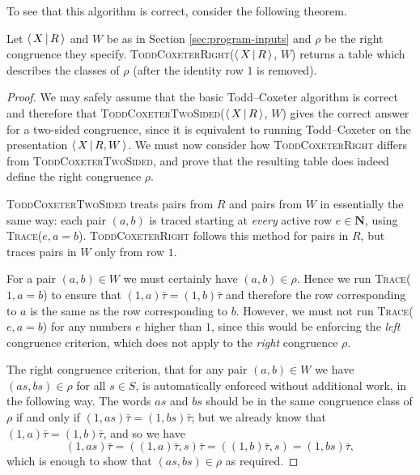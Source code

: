 To see that this algorithm is correct, consider the following theorem.

\begin{theorem}
  Let $\left\langle\,X\,\middle|\,R\,\right\rangle$ and $W$ be as in Section \ref{sec:program-inputs} and $\rho$
  be the right congruence they specify.
  \textsc{ToddCoxeterRight}($\left\langle\,X\,\middle|\,R\,\right\rangle$, $W$) returns a table which describes the
  classes of $\rho$ (after the identity row $1$ is removed).
  \begin{proof}
    We may safely assume that the basic Todd--Coxeter algorithm is correct
    \cite{todd_coxeter_1936, beetham_campbell_1976} and therefore that
    \textsc{ToddCoxeterTwoSided($\left\langle\,X\,\middle|\,R\,\right\rangle$, $W$)} gives the correct answer for a
    two-sided congruence, since it is equivalent to running Todd--Coxeter on the
    presentation $\left\langle\,X\,\middle|\,R,W\,\right\rangle$.  We must now consider how
    \textsc{ToddCoxeterRight} differs from \textsc{ToddCoxeterTwoSided}, and
    prove that the resulting table does indeed define the right congruence
    $\rho$.

    \textsc{ToddCoxeterTwoSided} treats pairs from $R$ and pairs from $W$ in
    essentially the same way: each pair $(a,b)$ is traced starting at
    \textit{every} active row $e \in \mathbf{N}$, using
    \textsc{Trace}($e, a=b$).  \textsc{ToddCoxeterRight} follows this method for
    pairs in $R$, but traces pairs in $W$ only from row $1$.

    For a pair $(a,b) \in W$ we must certainly have $(a,b) \in \rho$.  Hence we
    run \textsc{Trace($1, a=b$)} to ensure that $(1,a)\bar\tau = (1,b)\bar\tau$
    and therefore the row corresponding to $a$ is the same as the row
    corresponding to $b$.  However, we must not run \textsc{Trace($e, a=b$)} for
    any numbers $e$ higher than $1$, since this would be enforcing the
    \textit{left} congruence criterion, which does not apply to the
    \textit{right} congruence $\rho$.

    The right congruence criterion, that for any pair $(a,b) \in W$ we have
    $(as, bs) \in \rho$ for all $s \in S$, is automatically enforced without
    additional work, in the following way.  The words $as$ and $bs$ should be in
    the same congruence class of $\rho$ if and only if
    $(1, as)\bar\tau = (1, bs)\bar\tau$; but we already know that
    $(1, a)\bar\tau = (1, b)\bar\tau$, and so we have
    $$(1, as)\bar\tau
    = ((1, a)\bar\tau, s)\bar\tau
    = ((1, b)\bar\tau, s)
    = (1, bs)\bar\tau,$$
    which is enough to show that $(as, bs) \in \rho$ as required.
  \end{proof}
\end{theorem}

